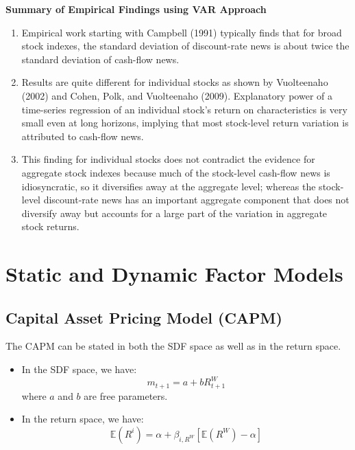 \documentclass[
]{book}
\begin{document}
\textbf{Summary of Empirical Findings using VAR Approach}

\begin{enumerate}
\def\labelenumi{\arabic{enumi}.}
\item
  Empirical work starting with Campbell (1991) typically finds that for broad stock indexes, the standard deviation of discount-rate news is about twice the standard deviation of cash-flow news.
\item
  Results are quite different for individual stocks as shown by Vuolteenaho (2002) and Cohen, Polk, and Vuolteenaho (2009). Explanatory power of a time-series regression of an individual stock's return on characteristics is very small even at long horizons, implying that most stock-level return variation is attributed to cash-flow news.
\item
  This finding for individual stocks does not contradict the evidence for aggregate stock indexes because much of the stock-level cash-flow news is idiosyncratic, so it diversifies away at the aggregate level; whereas the stock-level discount-rate news has an important aggregate component that does not diversify away but accounts for a large part of the variation in aggregate stock returns.
\end{enumerate}

\hypertarget{static-and-dynamic-factor-models}{%
\chapter{Static and Dynamic Factor Models}\label{static-and-dynamic-factor-models}}

\hypertarget{capital-asset-pricing-model-capm}{%
\section{Capital Asset Pricing Model (CAPM)}\label{capital-asset-pricing-model-capm}}

The CAPM can be stated in both the SDF space as well as in the return space.

\begin{itemize}
\item
  In the SDF space, we have:
  \[
  m_{t+1}=a+bR_{t+1}^{W}
  \]
  where \(a\) and \(b\) are free parameters.
\item
  In the return space, we have:
  \[
  \mathbb{E}\left(R^{i}\right)=\alpha+\beta_{i,R^{W}}\left[\mathbb{E}\left(R^{W}\right)-\alpha\right]
  \]
\end{itemize}
\end{document}

